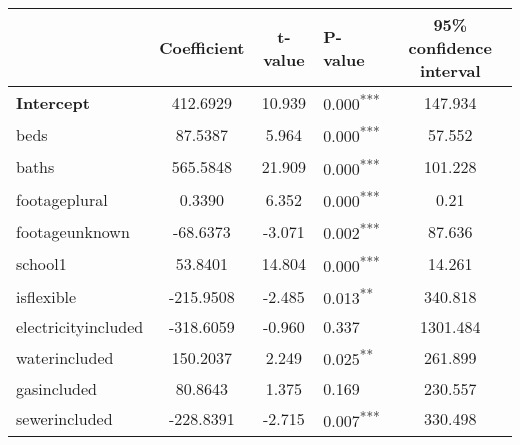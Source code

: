 \documentclass[12pt]{report}
\begin{document}
\renewcommand{\arraystretch}{0.5}
\begin{table}[H]
	\centering
	\begin{tabular}{l S[table-format=5.4] S[table-format=4.4] l S[table-format=4.4]}
		\hline\hline
		                                                 & \textbf{Coefficient} & \textbf{t-value} & \textbf{P-value}           & \textbf{95\% confidence interval} \\ \hline
		\textbf{Intercept}                               & 412.6929             & 10.939           & 0.000\textsuperscript{***} & 147.934                           \\
		beds                                             & 87.5387              & 5.964            & 0.000\textsuperscript{***} & 57.552                            \\
		baths                                            & 565.5848             & 21.909           & 0.000\textsuperscript{***} & 101.228                           \\
		footageplural                                    & 0.3390               & 6.352            & 0.000\textsuperscript{***} & 0.21                              \\
		footageunknown                                   & -68.6373             & -3.071           & 0.002\textsuperscript{***} & 87.636                            \\
		school1                                          & 53.8401              & 14.804           & 0.000\textsuperscript{***} & 14.261                            \\
		is\textunderscore flexible                       & -215.9508            & -2.485           & 0.013\textsuperscript{**}  & 340.818                           \\
		electricityincluded                              & -318.6059            & -0.960           & 0.337                      & 1301.484                          \\
		waterincluded                                    & 150.2037             & 2.249            & 0.025\textsuperscript{**}  & 261.899                           \\
		gasincluded                                      & 80.8643              & 1.375            & 0.169                      & 230.557                           \\
		sewerincluded                                    & -228.8391            & -2.715           & 0.007\textsuperscript{***} & 330.498                           \\

\end{tabular}
\end{table}
\end{document}
